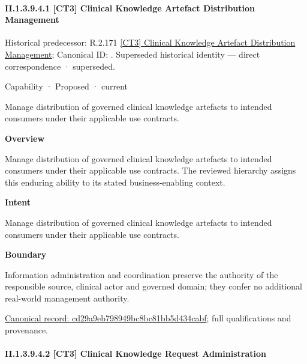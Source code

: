 \paragraph*{II.1.3.9.4.1 [CT3] Clinical Knowledge Artefact Distribution Management}
\label{navigation:II.1.3.9.4.1}

{\small Historical predecessor: R.2.171 \hyperref[element:d81e0d6d76014066a682e3d9e03e5f8a]{[CT3] Clinical Knowledge Artefact Distribution Management}; Canonical ID: \texttt{}. Superseded historical identity — direct correspondence · superseded.}\par
\label{element:cd29a9eb798949bc8bc81bb5d434cabf}
{\small Capability · Proposed · current}\par

Manage distribution of governed clinical knowledge artefacts to intended consumers under their applicable use contracts.



\textbf{Overview}



Manage distribution of governed clinical knowledge artefacts to intended consumers under their applicable use contracts. The reviewed hierarchy assigns this enduring ability to its stated business-enabling context.



\textbf{Intent}



Manage distribution of governed clinical knowledge artefacts to intended consumers under their applicable use contracts.



\textbf{Boundary}



Information administration and coordination preserve the authority of the responsible source, clinical actor and governed domain; they confer no additional real-world management authority.


{\footnotesize \href{../../../../continuum/strategy/capability/cd29a9eb798949bc8bc81bb5d434cabf.md}{Canonical record: cd29a9eb798949bc8bc81bb5d434cabf}; full qualifications and provenance.}\par
\paragraph*{II.1.3.9.4.2 [CT3] Clinical Knowledge Request Administration}
\label{navigation:II.1.3.9.4.2}

